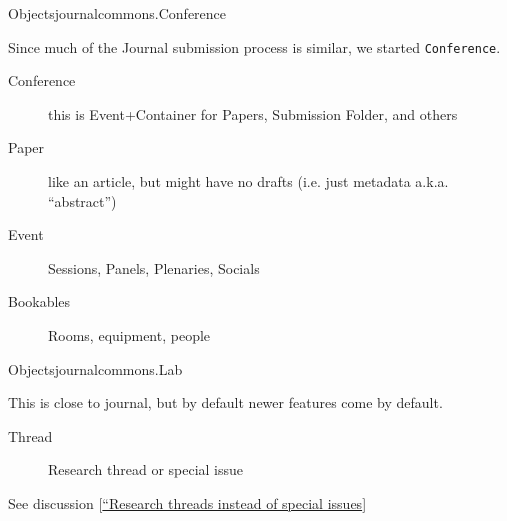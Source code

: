 \begin{frame}{Objects}{journalcommons.Conference}
  
  Since much of the Journal submission process is similar, we started
  {\tt Conference}.
  
 \begin{description}
  \item [Conference] this is Event+Container for Papers, Submission Folder, and others
  \item [Paper] like an article, but might have no drafts (i.e. just metadata a.k.a. ``abstract'')
  \item [Event] Sessions, Panels, Plenaries, Socials
  \item [Bookables] Rooms, equipment, people
 \end{description}
\end{frame}

\begin{frame}{Objects}{journalcommons.Lab}

This is close to journal, but by default newer features
come by default.

 \begin{description}
  \item [Thread] Research thread or special issue

 \end{description}

   See discussion \scriptsize
   [\href{http://www.oekonux.org/journal/list/archive/msg00250.html}{``Research
       threads instead of special issues}]
\end{frame}

